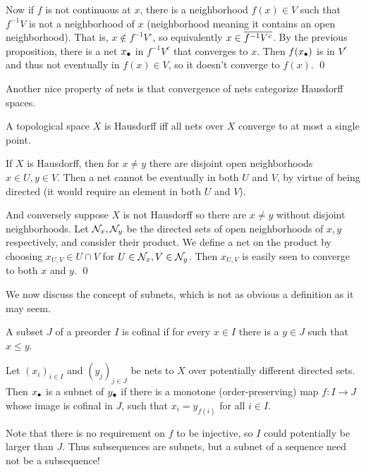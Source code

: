    Now if $f$ is not continuous at $x$, there is a neighborhood $f(x)\in V$ such that $f^{-1}V$ is not a neighborhood of $x$ (neighborhood meaning it contains an open
    neighborhood).
    That is, $x\notin f^{-1}V^\circ$, so equivalently $x\in\overline{f^{-1}V^c}$.
    By the previous proposition, there is a net $x_\bullet$ in $f^{-1}V^c$ that converges to $x$.
    Then $f(x_\bullet)$ is in $V^c$ and thus not eventually in $f(x)\in V$, so it doesn't converge to $f(x)$.
    \qed

\eproof

Another nice property of nets is that convergence of nets categorize Hausdorff spaces.

\bprop

    A topological space $X$ is Hausdorff iff all nets over $X$ converge to at most a single point.

\eprop

\bproof

    If $X$ is Hausdorff, then for $x\neq y$ there are disjoint open neighborhoods $x\in U,y\in V$.
    Then a net cannot be eventually in both $U$ and $V$, by virtue of being directed (it would require an element in both $U$ and $V$).

    And conversely suppose $X$ is not Hausdorff so there are $x\neq y$ without disjoint neighborhoods.
    Let ${{\cal N}}_x,{{\cal N}}_y$ be the directed sets of open neighborhoods of $x,y$ respectively, and consider their product.
    We define a net on the product by choosing $x_{U,V}\in U\cap V$ for $U\in{{\cal N}}_x,V\in{{\cal N}}_y$.
    Then $x_{U,V}$ is easily seen to converge to both $x$ and $y$.
    \qed

\eproof

We now discuss the concept of subnets, which is not as obvious a definition as it may seem.

\bdefn

    A subset $J$ of a preorder $I$ is {\emphcolor cofinal} if for every $x\in I$ there is a $y\in J$ such that $x\leq y$.

    Let $(x_i)_{i\in I}$ and $(y_j)_{j\in J}$ be nets to $X$ over potentially different directed sets.
    Then $x_\bullet$ is a {\emphcolor subnet} of $y_\bullet$ if there is a monotone (order-preserving) map $f\colon I\to J$ whose image is cofinal in $J$,
    such that $x_i=y_{f(i)}$ for all $i\in I$.

\edefn

Note that there is no requirement on $f$ to be injective, so $I$ could potentially be larger than $J$.
Thus subsequences are subnets, but a subnet of a sequence need not be a subsequence!


